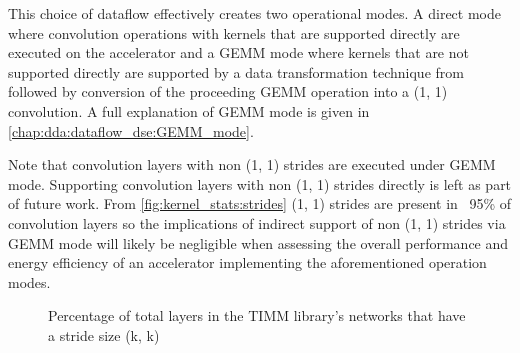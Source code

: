
This choice of dataflow effectively creates two operational modes. A direct mode
where convolution operations with kernels that are supported directly are
executed on the accelerator and a GEMM mode where kernels that are not supported
directly are supported by a data transformation technique from
\cite{cafe_con_troll} followed by conversion of the proceeding GEMM operation
into a (1, 1) convolution. A full explanation of GEMM mode is given in
\autoref{chap:dda:dataflow_dse:GEMM_mode}. 

Note that convolution layers with non (1, 1) strides are executed under GEMM
mode. Supporting convolution layers with non (1, 1) strides directly is left as
part of future work. From \autoref{fig:kernel_stats:strides} (1, 1) strides are
present in ~95\% of convolution layers so the implications of indirect support
of non (1, 1) strides via GEMM mode will likely be negligible when assessing the overall
performance and energy efficiency of an accelerator implementing the
aforementioned operation modes.

\begin{figure}
    \centering
    \caption{Percentage of total layers in the TIMM library's networks that have a stride size (k, k)}
    \label{fig:kernel_stats:strides}
\end{figure}


